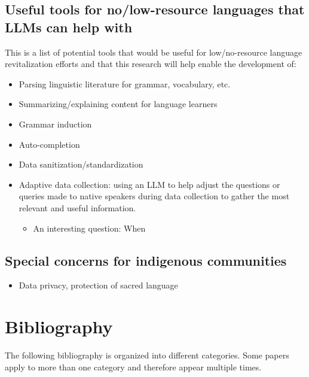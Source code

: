 \documentclass{article}
\begin{document}
\subsection*{Useful tools for no/low-resource languages that LLMs can help with}
This is a list of potential tools that would be useful for low/no-resource language revitalization efforts and that this research will help enable the development of:
\begin{itemize}
    \item Parsing linguistic literature for grammar, vocabulary, etc.
    \item Summarizing/explaining content for language learners
    \item Grammar induction
    \item Auto-completion
    \item Data sanitization/standardization
    \item Adaptive data collection: using an LLM to help adjust the questions or queries made to native speakers during data collection to gather the most relevant and useful information.
    \begin{itemize}
        \item An interesting question: When 
    \end{itemize}
\end{itemize}

\subsection*{Special concerns for indigenous communities}
\begin{itemize}
    \item Data privacy, protection of sacred language
\end{itemize}

\newpage
\section*{Bibliography}
The following bibliography is organized into different categories.
Some papers apply to more than one category and therefore appear multiple times.

\nocite{*}
\printbibliography[
    heading=bibsection,
    keyword={llm},
    title={Work on LLMs (Large Language Models)}
]
\printbibliography[
    heading=bibsection,
    keyword={low-resource},
    title={Work on Low-Resource Languages}
]
\printbibliography[
    heading=bibsection,
    keyword={rbmt},
    title={Work on RBMT (Rule-Based Machine Translation)}
]
\printbibliography[
    heading=bibsection,
    keyword={rag},
    title={Work on RAG (Retrieval Augmented Generation)}
]
\printbibliography[
    heading=bibsection,
    keyword={embeddings},
    title={Work on Embeddings \& Semantic Similarity}
]
\printbibliography[
    heading=bibsection,
    keyword={linguistic-probing},
    title={Work on Linguistic Probing}
]

\printbibliography[
    heading=bibsection,
    keyword={embeddings-models},
    title={Embeddings Models}
]
\printbibliography[
    heading=bibsection,
    keyword={other},
    title={Other References}
]
\end{document}
